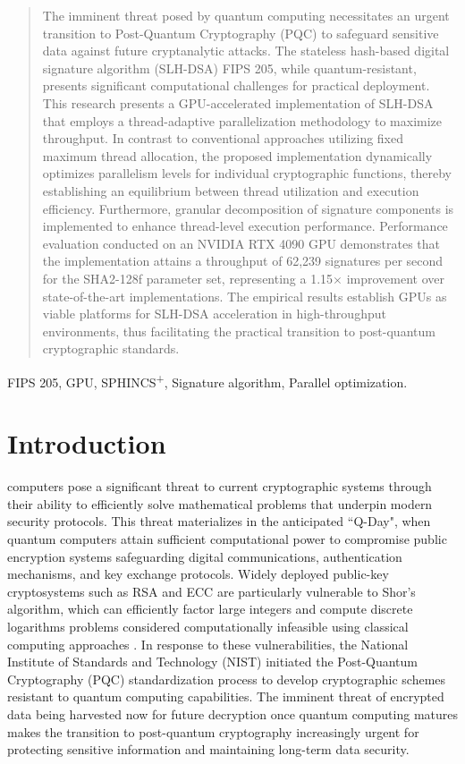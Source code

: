 \documentclass[journal]{IEEEtran}
\begin{document}
\begin{abstract}
  The imminent threat posed by quantum computing necessitates an urgent transition to Post-Quantum Cryptography (PQC) to safeguard sensitive data against future cryptanalytic attacks.
  The stateless hash-based digital signature algorithm (SLH-DSA) FIPS 205, while quantum-resistant, presents significant computational challenges for practical deployment.
  This research presents a GPU-accelerated implementation of SLH-DSA that employs a thread-adaptive parallelization methodology to maximize throughput.
  In contrast to conventional approaches utilizing fixed maximum thread allocation, the proposed implementation dynamically optimizes parallelism levels for individual cryptographic  functions, thereby establishing an equilibrium between thread utilization and execution efficiency.
  Furthermore, granular decomposition of signature components is implemented to enhance thread-level execution performance.
  Performance evaluation conducted on an NVIDIA RTX 4090 GPU demonstrates that the implementation attains a throughput of 62,239 signatures per second for the SHA2-128f parameter set, representing a 1.15$\times$ improvement over state-of-the-art implementations. 
  The empirical results establish GPUs as viable platforms for SLH-DSA acceleration in high-throughput environments, thus facilitating the practical transition to post-quantum cryptographic standards.
\end{abstract}

\begin{IEEEkeywords}
  FIPS 205, GPU, SPHINCS\textsuperscript{+}, Signature algorithm, Parallel optimization.
\end{IEEEkeywords}

\section{Introduction}
\label{sec:intro}

 computers pose a significant threat to current cryptographic systems through their ability to efficiently solve mathematical problems that underpin modern security protocols. This threat materializes in the anticipated ``Q-Day", when quantum computers attain sufficient computational power to compromise public encryption systems safeguarding digital communications, authentication mechanisms, and key exchange protocols. Widely deployed public-key cryptosystems such as RSA and ECC are particularly vulnerable to Shor's algorithm, which can efficiently factor large integers and compute discrete logarithms problems considered computationally infeasible using classical computing approaches \cite{Yang2023}.
In response to these vulnerabilities, the National Institute of Standards and Technology (NIST) initiated the Post-Quantum Cryptography (PQC) standardization process to develop cryptographic schemes resistant to quantum computing capabilities. The imminent threat of encrypted data being harvested now for future decryption once quantum computing matures makes the transition to post-quantum cryptography increasingly urgent for protecting sensitive information and maintaining long-term data security.
\end{document}
